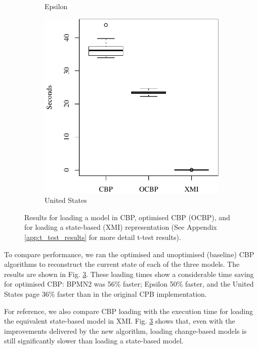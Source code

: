 \documentclass{llncs}
\begin{document}
\begin{figure}[ht]
\begin{subfigure}{0.325\textwidth}
            \caption{Epsilon}
            \label{fig:load_time_epsilon}
        \end{subfigure}
        \hfill
        \begin{subfigure}{0.325\textwidth}
            \centering
            \includegraphics[width=\linewidth]{images/load_time_wikipedia}
            \caption{United States}
            \label{fig:load_time_wikipedia}
        \end{subfigure}
        \caption{Results for loading a model in CBP, optimised CBP (OCBP), and for loading a state-based (XMI) representation (See Appendix \ref{app:t_test_results} for more detail t-test results).}
        \label{fig:loadtime}
    \end{figure}
    
    To compare performance, we ran the optimised and unoptimised (baseline) CBP algorithms to reconstruct the current state of each of the three  models. The results are shown in Fig. \ref{fig:loadtime}.  These loading times show a considerable time saving for optimised CBP: BPMN2 was 56\% faster; Epsilon 50\% faster, and the United States page 36\% faster than in the original CPB implementation.
    
    For reference, we also compare CBP loading with the execution time for loading the equivalent state-based model in XMI. Fig. \ref{fig:loadtime} shows that, even with the improvements delivered by the new algorithm, loading change-based models is still significantly slower than loading a state-based model.  
    
\end{document}
